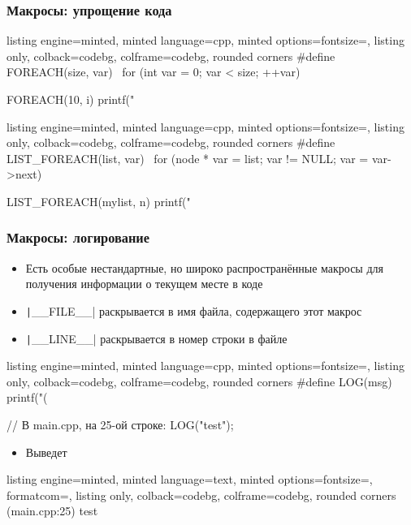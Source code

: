 \documentclass[10pt]{beamer}
\begin{document}
\begin{frame}[fragile]
\frametitle{Макросы: упрощение кода}
\begin{tcblisting}{listing engine=minted, minted language=cpp, minted options={fontsize=\scriptsize}, listing only, colback=codebg, colframe=codebg, rounded corners}
#define FOREACH(size, var) \
  for (int var = 0; var < size; ++var)

FOREACH(10, i) {
  printf("%
}
\end{tcblisting}
\pause
{}
\begin{tcblisting}{listing engine=minted, minted language=cpp, minted options={fontsize=\scriptsize}, listing only, colback=codebg, colframe=codebg, rounded corners}
#define LIST_FOREACH(list, var) \
  for (node * var = list; var != NULL; var = var->next)

LIST_FOREACH(mylist, n)
  printf("%
\end{tcblisting}
\end{frame}

\begin{frame}[fragile]
\frametitle{Макросы: логирование}
\begin{itemize}
\item Есть особые нестандартные, но широко распространённые макросы для получения информации о текущем месте в коде
\pause
\item \texttt|__FILE__| раскрывается в имя файла, содержащего этот макрос
\pause
\item \texttt|__LINE__| раскрывается в номер строки в файле
\end{itemize}
\pause
{}
\begin{tcblisting}{listing engine=minted, minted language=cpp, minted options={fontsize=\scriptsize}, listing only, colback=codebg, colframe=codebg, rounded corners}
#define LOG(msg) printf("(%

// В main.cpp, на 25-ой строке:
LOG("test");
\end{tcblisting}
\begin{itemize}
\item Выведет
\end{itemize}
\usemintedstyle{lightbulb}
\begin{tcblisting}{listing engine=minted, minted language=text, minted options={fontsize=\scriptsize, formatcom=\color{white}}, listing only, colback=codebg, colframe=codebg, rounded corners}
(main.cpp:25) test
\end{tcblisting}
\end{frame}
\end{document}
